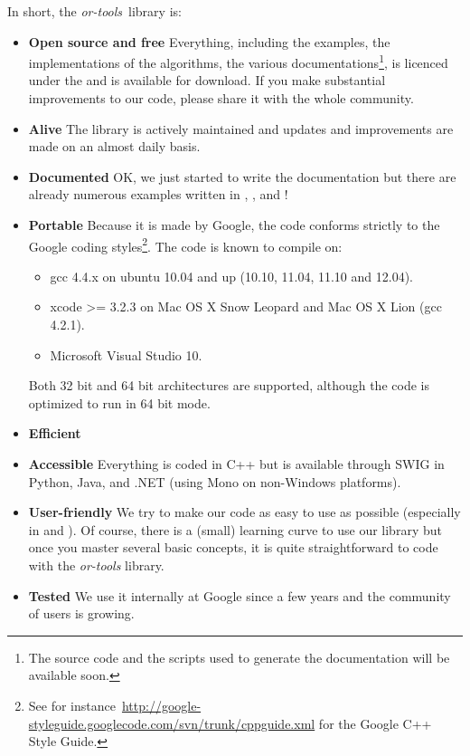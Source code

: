 \begin{titlepage}
\newpage
\pagestyle{plain}
In short, the \emph{or-tools}~library is:

\begin{itemize}
 \item {\bf Open source and free} Everything, including the examples, the implementations of the algorithms, the various 
       documentations\footnote{The source code and the scripts used to generate the documentation will be available soon.},  
       is licenced under the  and is available for download. If you make substantial improvements to our code, 
       please share it with the whole community.
 \item {\bf Alive} The library is actively maintained and updates and improvements are made on an almost daily basis.
 \item {\bf Documented} OK, we just started to write the documentation but there are already numerous examples written in , ,  and !
 \item {\bf Portable} Because it is made by Google, the code conforms strictly to the Google coding styles\footnote{See for instance~\href{http://google-styleguide.googlecode.com/svn/trunk/cppguide.xml}{http://google-styleguide.googlecode.com/svn/trunk/cppguide.xml} 
 for the Google C++ Style Guide.}. The code is known to compile on:
	\begin{itemize}
    \item gcc 4.4.x on ubuntu 10.04 and up (10.10, 11.04, 11.10 and 12.04).
    \item xcode >= 3.2.3 on Mac OS X Snow Leopard and Mac OS X Lion (gcc 4.2.1).
    \item Microsoft Visual Studio 10. 
	\end{itemize}
Both 32 bit and 64 bit architectures are supported, although the code is optimized to run in 64 bit mode.    
 \item {\bf Efficient} 
 \item {\bf Accessible} Everything is coded in C++ but is available through SWIG in Python, Java, and .NET (using Mono on non-Windows platforms). 
 \item {\bf User-friendly} We try to make our code as easy to use as possible (especially in  and ). 
       Of course, there is a (small) learning curve to use our library but once you master several basic concepts, it is quite straightforward to code with the \emph{or-tools} library. 
 \item {\bf Tested} We use it internally at Google since a few years and the community of users is growing.
\end{itemize} 
    

\end{titlepage}

